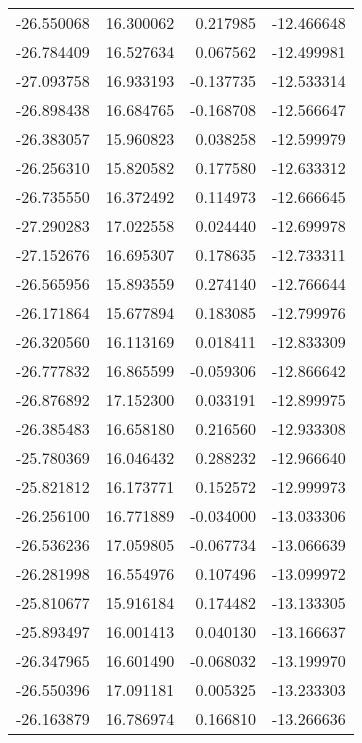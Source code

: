 \begin{tabular}{rrrr}
      -26.550068 &        16.300062 &    0.217985 & -12.466648 \\
      -26.784409 &        16.527634 &    0.067562 & -12.499981 \\
      -27.093758 &        16.933193 &   -0.137735 & -12.533314 \\
      -26.898438 &        16.684765 &   -0.168708 & -12.566647 \\
      -26.383057 &        15.960823 &    0.038258 & -12.599979 \\
      -26.256310 &        15.820582 &    0.177580 & -12.633312 \\
      -26.735550 &        16.372492 &    0.114973 & -12.666645 \\
      -27.290283 &        17.022558 &    0.024440 & -12.699978 \\
      -27.152676 &        16.695307 &    0.178635 & -12.733311 \\
      -26.565956 &        15.893559 &    0.274140 & -12.766644 \\
      -26.171864 &        15.677894 &    0.183085 & -12.799976 \\
      -26.320560 &        16.113169 &    0.018411 & -12.833309 \\
      -26.777832 &        16.865599 &   -0.059306 & -12.866642 \\
      -26.876892 &        17.152300 &    0.033191 & -12.899975 \\
      -26.385483 &        16.658180 &    0.216560 & -12.933308 \\
      -25.780369 &        16.046432 &    0.288232 & -12.966640 \\
      -25.821812 &        16.173771 &    0.152572 & -12.999973 \\
      -26.256100 &        16.771889 &   -0.034000 & -13.033306 \\
      -26.536236 &        17.059805 &   -0.067734 & -13.066639 \\
      -26.281998 &        16.554976 &    0.107496 & -13.099972 \\
      -25.810677 &        15.916184 &    0.174482 & -13.133305 \\
      -25.893497 &        16.001413 &    0.040130 & -13.166637 \\
      -26.347965 &        16.601490 &   -0.068032 & -13.199970 \\
      -26.550396 &        17.091181 &    0.005325 & -13.233303 \\
      -26.163879 &        16.786974 &    0.166810 & -13.266636 \\

\end{tabular}

